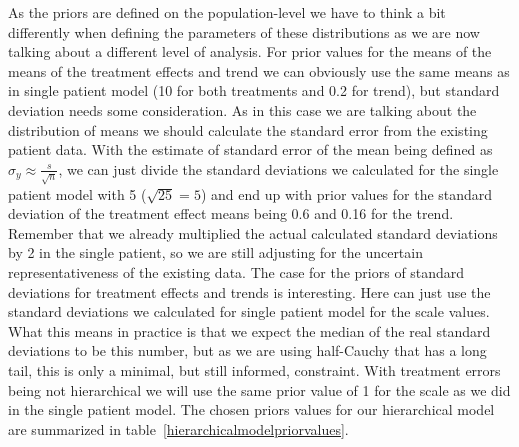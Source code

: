 \documentclass[12pt,a4paper,leqno]{report}
\theoremstyle{plain}
\theoremstyle{definition}
\theoremstyle{remark}
\begin{document}
As the priors are defined on the population-level we have to think a bit differently when defining the
parameters of these distributions as we are now talking about a different level of
analysis. For prior values for the means of the means of the treatment effects and trend
we can obviously use the same means as in single patient model (10 for both treatments and 0.2 for
trend), but standard deviation needs some consideration. As in this case we are talking about the
distribution of means we should calculate the standard error from the existing patient
data. With the estimate of standard error of the mean being defined as
\( \sigma_{y} \approx \frac{s}{\sqrt{n}} \), we can just divide the standard deviations
we calculated for the single patient model with 5 (\(\sqrt{25} = 5\)) and end up with
prior values for the standard
deviation of the treatment effect means being 0.6 and 0.16 for the trend. Remember that
we already multiplied the actual calculated standard deviations by 2 in the single
patient, so we are still adjusting for the uncertain representativeness of the
existing data. The case for the priors of standard deviations for treatment effects and
trends is interesting. Here can just use the standard deviations we calculated for
single patient model for the scale values. What this means in practice is that we expect the
median of the real standard deviations to be this number, but as we are using
half-Cauchy that has a long tail, this is only a minimal, but still informed,
constraint. With treatment errors being not hierarchical we will use the same prior value
of 1 for the scale as we did in the single patient model. The chosen priors values for
our hierarchical model are summarized in table\ \ref{hierarchicalmodelpriorvalues}.
\end{document}
